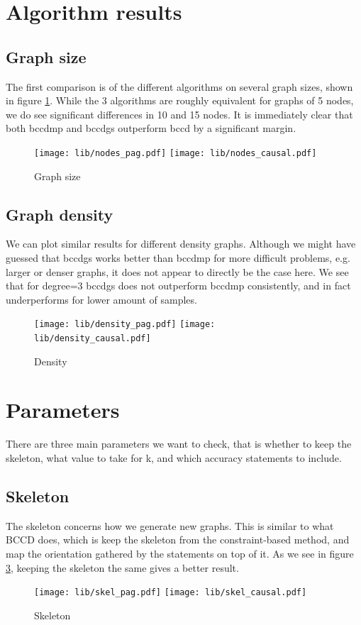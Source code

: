 \documentclass[11pt,a4paper]{report}
\begin{document}
\section{Algorithm results}

\subsection{Graph size}
The first comparison is of the different algorithms on several graph
sizes, shown in figure \ref{fig:nodes_causal}. While the 3 algorithms are
roughly equivalent for graphs of 5 nodes, we do see significant
differences in 10 and 15 nodes. It is immediately clear that both bccdmp
and bccdgs outperform bccd by a significant margin.
\begin{figure}
  \centering
  \texttt{[image: lib/nodes\_pag.pdf]}
  \texttt{[image: lib/nodes\_causal.pdf]}
  \caption{Graph size}
  \label{fig:nodes_causal}
\end{figure}

\subsection{Graph density}
We can plot similar results for different density graphs. Although we
might have guessed that bccdgs works better than bccdmp for more difficult
problems, e.g. larger or denser graphs, it does not appear to directly be
the case here. We see that for degree=3 bccdgs does not outperform bccdmp
consistently, and in fact underperforms for lower amount of samples.
\begin{figure}
  \centering
  \texttt{[image: lib/density\_pag.pdf]}
  \texttt{[image: lib/density\_causal.pdf]}
  \caption{Density}
  \label{fig:density_causal}
\end{figure}

\section{Parameters}
There are three main parameters we want to check, that is whether to keep
the skeleton, what value to take for k, and which accuracy statements to
include.

\subsection{Skeleton}
The skeleton concerns how we generate new graphs. This is similar to what
BCCD does, which is keep the skeleton from the constraint-based method,
and map the orientation gathered by the statements on top of it. As we see
in figure \ref{fig:skel_causal}, keeping the skeleton the same gives a
better result.
\begin{figure}
  \centering
  \texttt{[image: lib/skel\_pag.pdf]}
  \texttt{[image: lib/skel\_causal.pdf]}
  \caption{Skeleton}
  \label{fig:skel_causal}
\end{figure}
\end{document}
